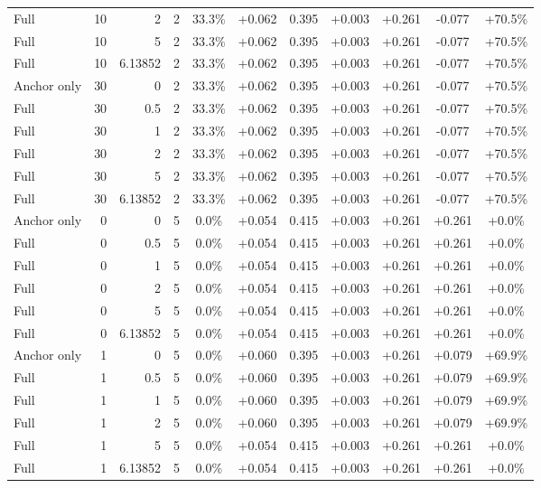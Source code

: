 \begin{table}[htbp]
\begin{tabular}{lrrrccccccc}
Full & 10 & 2 & 2 & 33.3\% & +0.062 & 0.395 & +0.003 & +0.261 & -0.077 & +70.5\% \\
Full & 10 & 5 & 2 & 33.3\% & +0.062 & 0.395 & +0.003 & +0.261 & -0.077 & +70.5\% \\
Full & 10 & 6.13852 & 2 & 33.3\% & +0.062 & 0.395 & +0.003 & +0.261 & -0.077 & +70.5\% \\
Anchor only & 30 & 0 & 2 & 33.3\% & +0.062 & 0.395 & +0.003 & +0.261 & -0.077 & +70.5\% \\
Full & 30 & 0.5 & 2 & 33.3\% & +0.062 & 0.395 & +0.003 & +0.261 & -0.077 & +70.5\% \\
Full & 30 & 1 & 2 & 33.3\% & +0.062 & 0.395 & +0.003 & +0.261 & -0.077 & +70.5\% \\
Full & 30 & 2 & 2 & 33.3\% & +0.062 & 0.395 & +0.003 & +0.261 & -0.077 & +70.5\% \\
Full & 30 & 5 & 2 & 33.3\% & +0.062 & 0.395 & +0.003 & +0.261 & -0.077 & +70.5\% \\
Full & 30 & 6.13852 & 2 & 33.3\% & +0.062 & 0.395 & +0.003 & +0.261 & -0.077 & +70.5\% \\
Anchor only & 0 & 0 & 5 & 0.0\% & +0.054 & 0.415 & +0.003 & +0.261 & +0.261 & +0.0\% \\
Full & 0 & 0.5 & 5 & 0.0\% & +0.054 & 0.415 & +0.003 & +0.261 & +0.261 & +0.0\% \\
Full & 0 & 1 & 5 & 0.0\% & +0.054 & 0.415 & +0.003 & +0.261 & +0.261 & +0.0\% \\
Full & 0 & 2 & 5 & 0.0\% & +0.054 & 0.415 & +0.003 & +0.261 & +0.261 & +0.0\% \\
Full & 0 & 5 & 5 & 0.0\% & +0.054 & 0.415 & +0.003 & +0.261 & +0.261 & +0.0\% \\
Full & 0 & 6.13852 & 5 & 0.0\% & +0.054 & 0.415 & +0.003 & +0.261 & +0.261 & +0.0\% \\
Anchor only & 1 & 0 & 5 & 0.0\% & +0.060 & 0.395 & +0.003 & +0.261 & +0.079 & +69.9\% \\
Full & 1 & 0.5 & 5 & 0.0\% & +0.060 & 0.395 & +0.003 & +0.261 & +0.079 & +69.9\% \\
Full & 1 & 1 & 5 & 0.0\% & +0.060 & 0.395 & +0.003 & +0.261 & +0.079 & +69.9\% \\
Full & 1 & 2 & 5 & 0.0\% & +0.060 & 0.395 & +0.003 & +0.261 & +0.079 & +69.9\% \\
Full & 1 & 5 & 5 & 0.0\% & +0.054 & 0.415 & +0.003 & +0.261 & +0.261 & +0.0\% \\
Full & 1 & 6.13852 & 5 & 0.0\% & +0.054 & 0.415 & +0.003 & +0.261 & +0.261 & +0.0\% \\

\end{tabular}
\end{table}
